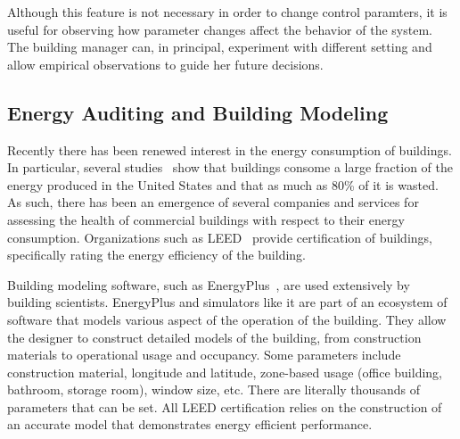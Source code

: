 Although this feature is not necessary in order to change control paramters, it is useful for observing how parameter changes
affect the behavior of the system.  The building manager can, in principal, experiment with different setting and allow
empirical observations to guide her future decisions.



\subsection{Energy Auditing and Building Modeling}
\label{sec:elensvision}
Recently there has been renewed interest in the energy consumption of buildings.  In particular, several studies~\cite{BuildingEnergyData,
MITBuildingScience} show that buildings consome a large fraction of the energy produced in the United States and that as much
as 80\% of it is wasted\cite{waste_science, next10_waste}.  As such, there has been an emergence of several companies and 
services for assessing the health of
commercial buildings with respect to their energy consumption.  Organizations such as LEED~\cite{Leed} provide certification of 
buildings, specifically rating the energy efficiency of the building.

Building modeling software, such as EnergyPlus~\cite{eplus}, are used extensively by building scientists. 
EnergyPlus and simulators like it are part of an ecosystem of software that models various aspect of the operation
of the building.  They allow the designer to construct detailed models of the building, from construction materials to 
operational usage and occupancy.  Some parameters include
construction material, longitude and latitude, zone-based usage (office building, bathroom, storage room), window size, etc.  
There are literally thousands of parameters that can be set.  All LEED certification relies on the construction of an 
accurate model that demonstrates energy efficient performance.

